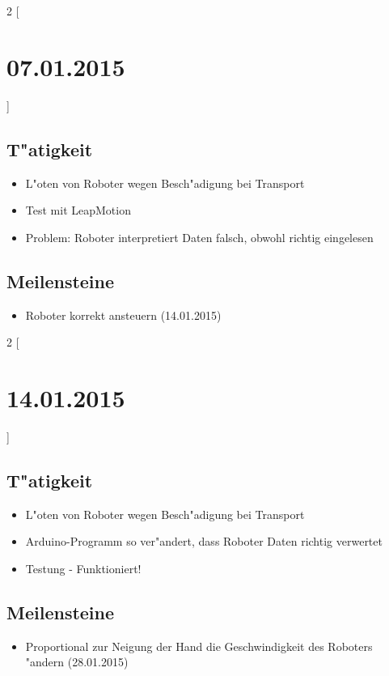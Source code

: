 \documentclass[11pt,a4paper]{article}
\begin{document}
\begin{multicols}{2}
[\section*{  07.01.2015  }] 

\subsection*{T"atigkeit}
\begin{itemize}
\item L"oten von Roboter wegen Besch"adigung bei Transport
\item Test mit LeapMotion
\item Problem: Roboter interpretiert Daten falsch, obwohl richtig eingelesen
\end{itemize}

\columnbreak

\subsection*{Meilensteine}

\begin{itemize}
\item Roboter korrekt ansteuern (14.01.2015)
\end{itemize}

\end{multicols}



\begin{multicols}{2}
[\section*{  14.01.2015  }] 

\subsection*{T"atigkeit}
\begin{itemize}
\item L"oten von Roboter wegen Besch"adigung bei Transport
\item Arduino-Programm so ver"andert, dass Roboter Daten richtig verwertet
\item Testung - Funktioniert!
\end{itemize}

\columnbreak

\subsection*{Meilensteine}

\begin{itemize}
\item Proportional zur Neigung der Hand die Geschwindigkeit des Roboters "andern (28.01.2015)
\end{itemize}

\end{multicols}
\end{document}
